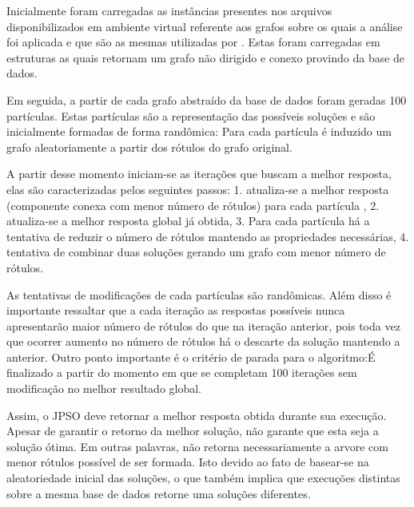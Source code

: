 \documentclass{sig-alternate-05-2015}
\begin{document}
Inicialmente foram carregadas as instâncias presentes nos arquivos disponibilizados em ambiente virtual referente aos grafos sobre os quais a análise foi aplicada e que são as  mesmas utilizadas por \cite{}. Estas foram carregadas em estruturas as quais retornam um grafo não dirigido e conexo provindo da base de dados. 
	
Em seguida, a partir de cada grafo abstraído da base de dados foram geradas 100 partículas. Estas partículas são a representação das possíveis soluções e são inicialmente formadas de forma randômica: Para cada partícula é induzido um grafo aleatoriamente a partir dos rótulos do grafo original.

A partir desse momento iniciam-se as iterações que buscam a melhor resposta, elas são caracterizadas pelos seguintes passos: 1. atualiza-se a melhor resposta (componente conexa com menor número de rótulos) para cada partícula , 2. atualiza-se a melhor resposta global já obtida, 3. Para cada partícula há a tentativa de reduzir o número de rótulos mantendo as propriedades necessárias, 4. tentativa de combinar duas soluções gerando um grafo com menor número de rótulos.

As tentativas de modificações de cada partículas são randômicas. Além disso é importante ressaltar que a cada iteração as respostas possíveis nunca apresentarão maior número de rótulos do que na iteração anterior, pois toda vez que ocorrer aumento no número de rótulos há o descarte da solução mantendo a anterior. Outro ponto importante é o critério de parada para o algoritmo:É finalizado a partir do momento em que se completam 100 iterações sem modificação no melhor resultado global.

Assim, o JPSO deve retornar a melhor resposta obtida durante sua execução. Apesar de garantir o retorno da melhor solução, não garante que esta seja a solução ótima. Em outras palavras, não retorna necessariamente a arvore com menor rótulos possível de ser formada. Isto devido ao fato de basear-se na aleatoriedade inicial das soluções, o que também implica que execuções distintas sobre a mesma base de dados retorne uma soluções diferentes.
\end{document}

